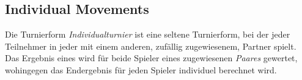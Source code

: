 \subsection{Individual Movements}

\noindent
Die Turnierform \textit{Individualturnier} ist eine seltene Turnierform, bei der
jeder Teilnehmer in jeder \ru mit einem anderen, zufällig zugewiesenem, Partner spielt.
Das Ergebnis eines \bos wird für beide Spieler eines zugewiesenen \textit{Paares}
gewertet, wohingegen das Endergebnis für jeden Spieler individuel berechnet wird.

